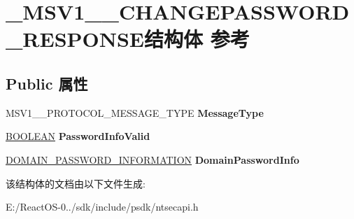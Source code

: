 \hypertarget{struct___m_s_v1__0___c_h_a_n_g_e_p_a_s_s_w_o_r_d___r_e_s_p_o_n_s_e}{}\section{\+\_\+\+M\+S\+V1\+\_\+\_\+\+C\+H\+A\+N\+G\+E\+P\+A\+S\+S\+W\+O\+R\+D\+\_\+\+R\+E\+S\+P\+O\+N\+S\+E结构体 参考}
\label{struct___m_s_v1__0___c_h_a_n_g_e_p_a_s_s_w_o_r_d___r_e_s_p_o_n_s_e}
\subsection*{Public 属性}
\begin{DoxyCompactItemize}
\item 
\mbox{\label{struct___m_s_v1__0___c_h_a_n_g_e_p_a_s_s_w_o_r_d___r_e_s_p_o_n_s_e_ae6f7069efab3fb15f55482a03ebe9303}} 
M\+S\+V1\+\_\+\_\+\+P\+R\+O\+T\+O\+C\+O\+L\+\_\+\+M\+E\+S\+S\+A\+G\+E\+\_\+\+T\+Y\+PE {\bfseries Message\+Type}
\item 
\mbox{\label{struct___m_s_v1__0___c_h_a_n_g_e_p_a_s_s_w_o_r_d___r_e_s_p_o_n_s_e_a50725cff5203fbffe63787c8d4b4c520}} 
\hyperlink{_processor_bind_8h_a112e3146cb38b6ee95e64d85842e380a}{B\+O\+O\+L\+E\+AN} {\bfseries Password\+Info\+Valid}
\item 
\mbox{\label{struct___m_s_v1__0___c_h_a_n_g_e_p_a_s_s_w_o_r_d___r_e_s_p_o_n_s_e_a3050ba3f5dd8307de29b86cb10d36c40}} 
\hyperlink{struct___d_o_m_a_i_n___p_a_s_s_w_o_r_d___i_n_f_o_r_m_a_t_i_o_n}{D\+O\+M\+A\+I\+N\+\_\+\+P\+A\+S\+S\+W\+O\+R\+D\+\_\+\+I\+N\+F\+O\+R\+M\+A\+T\+I\+ON} {\bfseries Domain\+Password\+Info}
\end{DoxyCompactItemize}


该结构体的文档由以下文件生成\+:\begin{DoxyCompactItemize}
\item 
E\+:/\+React\+O\+S-\/0../sdk/include/psdk/ntsecapi.\+h\end{DoxyCompactItemize}

